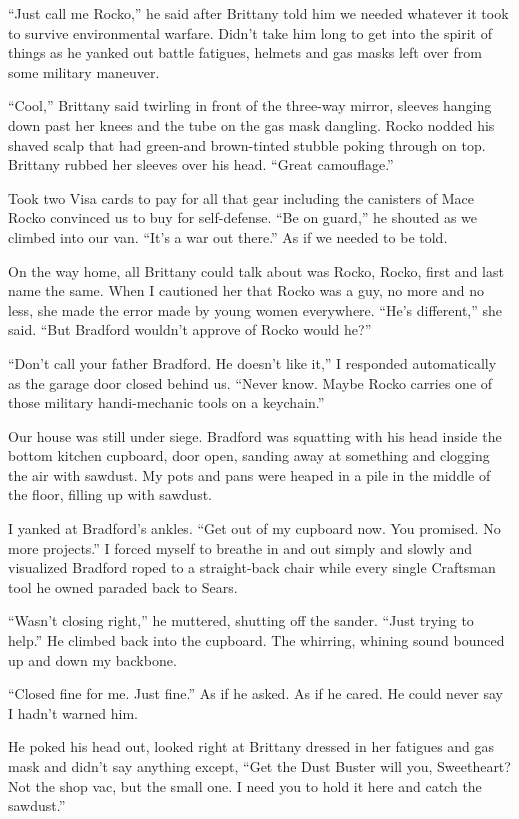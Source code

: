 \documentclass[twoside,10pt]{book}
\begin{document}
``Just call me Rocko,'' he said after Brittany told him we needed
whatever it took to survive environmental warfare. Didn't take him long
to get into the spirit of things as he yanked out battle fatigues,
helmets and gas masks left over from some military maneuver.

``Cool,'' Brittany said twirling in front of the three-way mirror,
sleeves hanging down past her knees and the tube on the gas mask
dangling. Rocko nodded his shaved scalp that had green-and brown-tinted
stubble poking through on top. Brittany rubbed her sleeves over his
head. ``Great camouflage.''

Took two Visa cards to pay for all that gear including the canisters of
Mace Rocko convinced us to buy for self-defense. ``Be on guard,'' he
shouted as we climbed into our van. ``It's a war out there.'' As if we
needed to be told.

On the way home, all Brittany could talk about was Rocko, Rocko, first
and last name the same. When I cautioned her that Rocko was a guy, no
more and no less, she made the error made by young women everywhere.
``He's different,'' she said. ``But Bradford wouldn't approve of Rocko
would he?''

``Don't call your father Bradford. He doesn't like it,'' I responded
automatically as the garage door closed behind us. ``Never know. Maybe
Rocko carries one of those military handi-mechanic tools on a
keychain.''

Our house was still under siege. Bradford was squatting with his head
inside the bottom kitchen cupboard, door open, sanding away at something
and clogging the air with sawdust. My pots and pans were heaped in a
pile in the middle of the floor, filling up with sawdust.

I yanked at Bradford's ankles. ``Get out of my cupboard now. You
promised. No more pro­jects.'' I forced myself to breathe in and out
simply and slowly and visualized Bradford roped to a straight-back chair
while every single Craftsman tool he owned paraded back to Sears.

``Wasn't closing right,'' he muttered, shutting off the sander. ``Just
trying to help.'' He climbed back into the cupboard. The whirring,
whining sound bounced up and down my backbone.

``Closed fine for me. Just fine.'' As if he asked. As if he cared. He
could never say I hadn't warned him.

He poked his head out, looked right at Brittany dressed in her fatigues
and gas mask and didn't say anything except, ``Get the Dust Buster will
you, Sweetheart? Not the shop vac, but the small one. I need you to hold
it here and catch the sawdust.''
\end{document}
